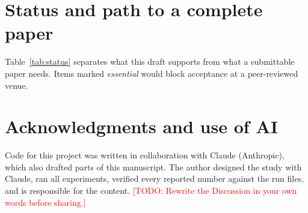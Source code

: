 \documentclass[10pt,twocolumn,letterpaper]{article}
\newcommand{\todo}[1]{\textcolor{red}{[TODO: #1]}}
\begin{document}
\section{Status and path to a complete paper}
\label{sec:status}
Table~\ref{tab:status} separates what this draft supports from what a submittable paper needs. Items marked \emph{essential} would block acceptance at a peer-reviewed venue.

\section*{Acknowledgments and use of AI}
Code for this project was written in collaboration with Claude (Anthropic), which also drafted parts of this manuscript. The author designed the study with Claude, ran all experiments, verified every reported number against the run files, and is responsible for the content. \todo{Rewrite the Discussion in your own words before sharing.}

{\small


}
\end{document}
